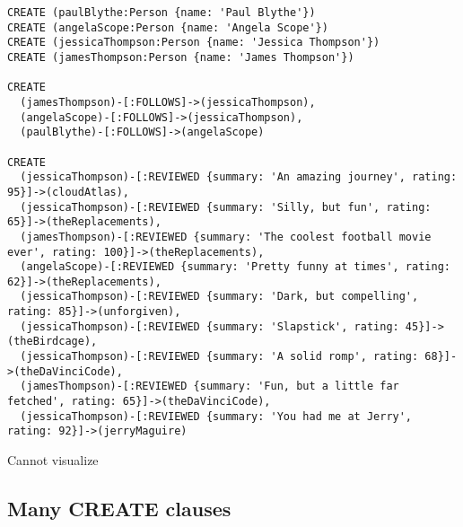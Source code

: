 \begin{lstlisting}
CREATE (paulBlythe:Person {name: 'Paul Blythe'})
CREATE (angelaScope:Person {name: 'Angela Scope'})
CREATE (jessicaThompson:Person {name: 'Jessica Thompson'})
CREATE (jamesThompson:Person {name: 'James Thompson'})

CREATE
  (jamesThompson)-[:FOLLOWS]->(jessicaThompson),
  (angelaScope)-[:FOLLOWS]->(jessicaThompson),
  (paulBlythe)-[:FOLLOWS]->(angelaScope)

CREATE
  (jessicaThompson)-[:REVIEWED {summary: 'An amazing journey', rating: 95}]->(cloudAtlas),
  (jessicaThompson)-[:REVIEWED {summary: 'Silly, but fun', rating: 65}]->(theReplacements),
  (jamesThompson)-[:REVIEWED {summary: 'The coolest football movie ever', rating: 100}]->(theReplacements),
  (angelaScope)-[:REVIEWED {summary: 'Pretty funny at times', rating: 62}]->(theReplacements),
  (jessicaThompson)-[:REVIEWED {summary: 'Dark, but compelling', rating: 85}]->(unforgiven),
  (jessicaThompson)-[:REVIEWED {summary: 'Slapstick', rating: 45}]->(theBirdcage),
  (jessicaThompson)-[:REVIEWED {summary: 'A solid romp', rating: 68}]->(theDaVinciCode),
  (jamesThompson)-[:REVIEWED {summary: 'Fun, but a little far fetched', rating: 65}]->(theDaVinciCode),
  (jessicaThompson)-[:REVIEWED {summary: 'You had me at Jerry', rating: 92}]->(jerryMaguire)
\end{lstlisting}

Cannot visualize
\subsection{Many CREATE clauses}

